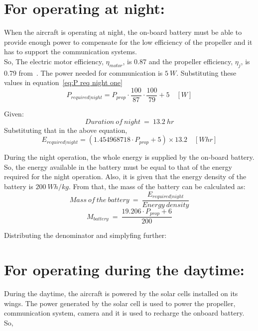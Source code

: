 \section{For operating at night:}

\p When the aircraft is operating at night, the on-board battery must be able to provide enough power to compensate for the low efficiency of the propeller and it has to support the communication systems. \\
\p So,
\noindent The electric motor efficiency, $\eta_{motor}$, is 0.87 and the propeller efficiency, $\eta_j$, is 0.79 from~\cite{Manual}. The power needed for communication is $5 \ W$. Substituting these values in equation~\ref{eq:P req night one}
\[ P_{required | night} = P_{prop} \cdot \frac{100}{87} \cdot \frac{100}{79} + 5 \quad [W] \]

\noindent Given: \[ Duration \ of \ night \ = \ 13.2 \ hr \]
Substituting that in the above equation,
\[ E_{required | night} = (1.454968718 \cdot P_{prop} + 5) \times 13.2 \quad [Whr] \]

\p During the night operation, the whole energy is supplied by the on-board battery. So, the energy available in the battery must be equal to that of the energy required for the night operation. Also, it is given that the energy density of the battery is $ 200 \ Wh/kg $. From that, the mass of the battery can be calculated as:
\[ Mass \ of \ the \ battery \ = \ \frac{ E_{required | night} }{ Energy \ density } \]
\[ M_{battery} \ = \ \frac{ 19.206 \cdot P_{prop} + 6 }{ 200 } \]

\noindent Distributing the denominator and simplyfing further:

\section{For operating during the daytime:}

\p During the daytime, the aircraft is powered by the solar cells installed on its wings. The power generated by the solar cell is used to power the propeller, communication system, camera and it is used to recharge the onboard battery.\\
\p So,

